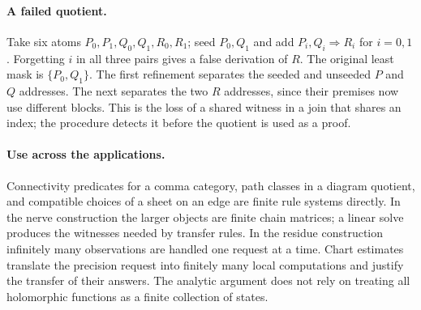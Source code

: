 \paragraph{A failed quotient.}
Take six atoms $P_0,P_1,Q_0,Q_1,R_0,R_1$; seed $P_0,Q_1$ and add $P_i,Q_i\Rightarrow R_i$ for $i=0,1$. Forgetting $i$ in all three pairs gives a false derivation of $R$. The original least mask is $\{P_0,Q_1\}$. The first refinement separates the seeded and unseeded $P$ and $Q$ addresses. The next separates the two $R$ addresses, since their premises now use different blocks. This is the loss of a shared witness in a join that shares an index; the procedure detects it before the quotient is used as a proof.

\paragraph{Use across the applications.}
Connectivity predicates for a comma category, path classes in a diagram quotient, and compatible choices of a sheet on an edge are finite rule systems directly. In the nerve construction the larger objects are finite chain matrices; a linear solve produces the witnesses needed by transfer rules. In the residue construction infinitely many observations are handled one request at a time. Chart estimates translate the precision request into finitely many local computations and justify the transfer of their answers. The analytic argument does not rely on treating all holomorphic functions as a finite collection of states.
